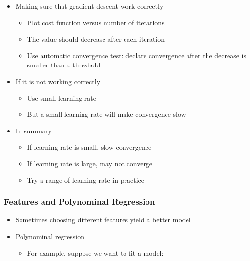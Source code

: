 \documentclass[]{article}
\providecommand{\tightlist}{%
  \setlength{\itemsep}{0pt}\setlength{\parskip}{0pt}}
\begin{document}
\begin{itemize}
\tightlist
\item
  Making sure that gradient descent work correctly

  \begin{itemize}
  \tightlist
  \item
    Plot cost function versus number of iterations
  \item
    The value should decrease after each iteration
  \item
    Use automatic convergence test: declare convergence after the
    decrease is smaller than a threshold
  \end{itemize}
\item
  If it is not working correctly

  \begin{itemize}
  \tightlist
  \item
    Use small learning rate
  \item
    But a small learning rate will make convergence slow
  \end{itemize}
\item
  In summary

  \begin{itemize}
  \tightlist
  \item
    If learning rate is small, slow convergence
  \item
    If learning rate is large, may not converge
  \item
    Try a range of learning rate in practice
  \end{itemize}
\end{itemize}

\hypertarget{features-and-polynominal-regression}{%
\subsubsection{Features and Polynominal
Regression}\label{features-and-polynominal-regression}}

\begin{itemize}
\tightlist
\item
  Sometimes choosing different features yield a better model
\item
  Polynominal regression

  \begin{itemize}
  \tightlist
  \item
    For example, suppose we want to fit a model:
  \end{itemize}
\end{itemize}
\end{document}
